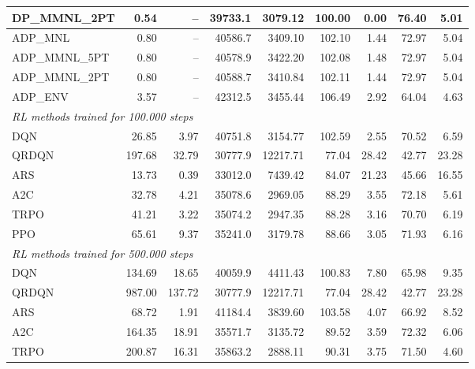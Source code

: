 \begin{samepage}
\begin{center}
\begin{tabular}{l|rr|rr|rr|rr}
    DP\_MMNL\_2PT &     0.54 &    -- &    39733.1 &    3079.12 &  100.00 &    0.00 &   76.40 &    5.01 \\
    \midrule
    ADP\_MNL     &     0.80 &    -- &    40586.7 &    3409.10 &  102.10 &    1.44 &   72.97 &    5.04 \\
    ADP\_MMNL\_5PT &     0.80 &    -- &    40578.9 &    3422.20 &  102.08 &    1.48 &   72.97 &    5.04 \\
    ADP\_MMNL\_2PT &     0.80 &    -- &    40588.7 &    3410.84 &  102.11 &    1.44 &   72.97 &    5.04 \\
    ADP\_ENV     &     3.57 &    -- &    42312.5 &    3455.44 &  106.49 &    2.92 &   64.04 &    4.63 \\
    \midrule
    \multicolumn{9}{l}{\textit{RL methods trained for 100.000 steps}} \\
    \midrule
    DQN          &    26.85 &     3.97 &    40751.8 &    3154.77 &  102.59 &    2.55 &   70.52 &    6.59 \\
    QRDQN        &   197.68 &    32.79 &    30777.9 &   12217.71 &   77.04 &   28.42 &   42.77 &   23.28 \\
    ARS          &    13.73 &     0.39 &    33012.0 &    7439.42 &   84.07 &   21.23 &   45.66 &   16.55 \\
    A2C          &    32.78 &     4.21 &    35078.6 &    2969.05 &   88.29 &    3.55 &   72.18 &    5.61 \\
    TRPO         &    41.21 &     3.22 &    35074.2 &    2947.35 &   88.28 &    3.16 &   70.70 &    6.19 \\
    PPO          &    65.61 &     9.37 &    35241.0 &    3179.78 &   88.66 &    3.05 &   71.93 &    6.16 \\
    \midrule
    \multicolumn{9}{l}{\textit{RL methods trained for 500.000 steps}} \\
    \midrule
    DQN          &   134.69 &    18.65 &    40059.9 &    4411.43 &  100.83 &    7.80 &   65.98 &    9.35 \\
    QRDQN        &   987.00 &   137.72 &    30777.9 &   12217.71 &   77.04 &   28.42 &   42.77 &   23.28 \\
    ARS          &    68.72 &     1.91 &    41184.4 &    3839.60 &  103.58 &    4.07 &   66.92 &    8.52 \\
    A2C          &   164.35 &    18.91 &    35571.7 &    3135.72 &   89.52 &    3.59 &   72.32 &    6.06 \\
    TRPO         &   200.87 &    16.31 &    35863.2 &    2888.11 &   90.31 &    3.75 &   71.50 &    4.60 \\

\end{tabular}
\end{center}
\end{samepage}
